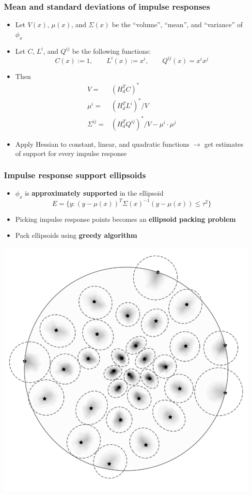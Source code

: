 \documentclass[10pt,final,xcolor=dvipsnames]{beamer}
\begin{document}
\begin{frame}
	\frametitle{Mean and standard deviations of impulse responses}
	\begin{itemize}
		\setlength\itemsep{2em}
		\item Let $V(x)$, $\mu(x)$, and $\Sigma(x)$ be the ``volume'', ``mean'', and ``variance'' of $\phi_x$
		\item Let $C$, $L^i$, and $Q^{ij}$ be the following functions:
		\begin{equation*}
		C(x) := 1, \qquad
		L^i(x) := x^i, \qquad
		Q^{ij}(x) = x^i x^j
		\end{equation*}
		\item Then
		\begin{align*}
		V =& \left(H_d^T C\right)^* \\
		\mu^i =& \left(H_d^T L^i\right)^* / V \\
		\Sigma^{ij} =& \left(H_d^T Q^{ij}\right)^* / V - \mu^i\cdot \mu^j
		\end{align*}
		\item Apply Hessian to constant, linear, and quadratic functions $\rightarrow$ get estimates of support for every impulse response
	\end{itemize}
	
\end{frame}
\begin{frame}
	\frametitle{Impulse response support ellipsoids}
	\begin{itemize}
		\item $\phi_x$ is \textbf{approximately supported} in the ellipsoid
		$$E = \{y: (y - \mu(x))^T\Sigma(x)^{-1}(y - \mu(x)) \le \tau^2\}$$
		
		\item Picking impulse response points becomes an \textbf{ellipsoid packing problem}
		
		\item Pack ellipsoids using \textbf{greedy algorithm}
	\end{itemize}
	\begin{center}
		\includegraphics[width=0.5\columnwidth]{impulse_batch2.png} 
	\end{center}
\end{frame}
\end{document}
